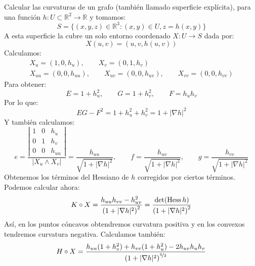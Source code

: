 \begin{ejercicio}
    Calcular las curvaturas de un grafo (también llamado superficie explícita), para una función $h:U\subset\mathbb{R}^2\to\mathbb{R}$ y tomamos:
    \begin{equation*}
        S = \{(x,y,z)\in \mathbb{R}^3 : (x,y)\in U, z = h(x,y)\}
    \end{equation*}
    A esta superficie la cubre un solo entorno coordenado $X:U\to S$  dada por:
    \begin{equation*}
        X(u,v) = (u,v,h(u,v))
    \end{equation*}
    Calculamos:
    \begin{gather*}
        X_u = (1,0,h_u), \qquad X_v = (0,1,h_v) \\
        X_{uu} = (0,0,h_{uu}), \qquad X_{uv} = (0,0,h_{uv}), \qquad X_{vv} = (0,0,h_{vv})
    \end{gather*}
    Para obtener:
    \begin{equation*}
        E = 1+h_u^2, \qquad G = 1+h_v^2, \qquad F = h_uh_v
    \end{equation*}
    Por lo que:
    \begin{equation*}
        EG-F^2 = 1 + h_u^2 + h_v^2 = 1+|\nabla h|^2
    \end{equation*}
    Y también calculamos:
    \begin{equation*}
        e = \frac{\left|\begin{array}{ccc}
            1 & 0 & h_u \\
            0 & 1 & h_v \\
            0 & 0 & h_{uu}
        \end{array}\right|}{|X_u\land X_v|} = \frac{h_{uu}}{\sqrt{1+|\nabla h|^2}}, \qquad f = \frac{h_{uv}}{\sqrt{1+|\nabla h|^2}}, \qquad g = \frac{h_{vv}}{\sqrt{1+|\nabla h|^2}}
    \end{equation*}
    Obtenemos los términos del Hessiano de $h$ corregidos por ciertos términos. Podemos calcular ahora:
    \begin{equation*}
        K\circ X = \frac{h_{uu}h_{vv}-h_{uv}^2}{{(1+|\nabla h|^2)}^{2}} = \frac{\det(\operatorname{Hess} h)}{{(1+|\nabla h|^2)}^{2}}
    \end{equation*}
    Así, en los puntos cóncavos obtendremos curvatura positiva y en los convexos tendremos curvatura negativa. Calculamos también:
    \begin{equation*}
        H\circ X = \frac{h_{uu}(1+h_v^2) + h_{vv}(1+h_u^2) - 2h_{uv}h_uh_v}{{(1+|\nabla h|^2)}^{\nicefrac{3}{2}}}
    \end{equation*}
\end{ejercicio}

